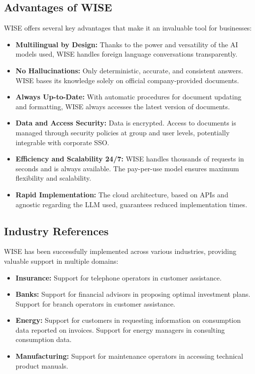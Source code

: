 \subsection{Advantages of WISE}

WISE offers several key advantages that make it an invaluable tool for businesses:

\begin{itemize}
    \item \textbf{Multilingual by Design:} Thanks to the power and versatility of the AI models used, WISE handles foreign language conversations transparently.
    \item \textbf{No Hallucinations:} Only deterministic, accurate, and consistent answers. WISE bases its knowledge solely on official company-provided documents.
    \item \textbf{Always Up-to-Date:} With automatic procedures for document updating and formatting, WISE always accesses the latest version of documents.
    \item \textbf{Data and Access Security:} Data is encrypted. Access to documents is managed through security policies at group and user levels, potentially integrable with corporate SSO.
    \item \textbf{Efficiency and Scalability 24/7:} WISE handles thousands of requests in seconds and is always available. The pay-per-use model ensures maximum flexibility and scalability.
    \item \textbf{Rapid Implementation:} The cloud architecture, based on APIs and agnostic regarding the LLM used, guarantees reduced implementation times.
\end{itemize}

\subsection{Industry References}

WISE has been successfully implemented across various industries, providing valuable support in multiple domains:

\begin{itemize}
    \item \textbf{Insurance:} Support for telephone operators in customer assistance.
    \item \textbf{Banks:} Support for financial advisors in proposing optimal investment plans. Support for branch operators in customer assistance.
    \item \textbf{Energy:} Support for customers in requesting information on consumption data reported on invoices. Support for energy managers in consulting consumption data.
    \item \textbf{Manufacturing:} Support for maintenance operators in accessing technical product manuals.
\end{itemize}


